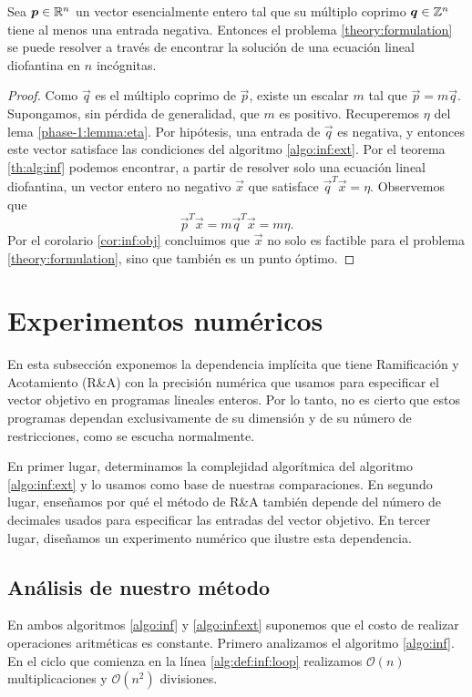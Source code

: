 \begin{theorem}
	\label{infinite:th:complexity}
	Sea $\boldsymbol{p} \in \mathbb{R}^n$ un vector esencialmente entero tal que su múltiplo coprimo $\boldsymbol{q} \in
	\mathbb{Z}^n$ tiene al menos una entrada negativa. Entonces el problema \eqref{theory:formulation} se
	puede resolver a través de encontrar la solución de una ecuación lineal diofantina en $n$
	incógnitas.
\end{theorem}
\begin{proof}
	Como $\vec{q}$ es el múltiplo coprimo de $\vec{p}$, existe un escalar $m$ tal que
	$\vec{p} = m\vec{q}$. Supongamos, sin pérdida de generalidad, que $m$ es positivo. Recuperemos
	$\eta$ del lema \ref{phase-1:lemma:eta}. Por hipótesis, una entrada de $\vec{q}$ es negativa, y
	entonces este vector satisface las condiciones del algoritmo \ref{algo:inf:ext}. Por el teorema
	\ref{th:alg:inf} podemos encontrar, a partir de resolver solo una ecuación lineal diofantina, un
	vector entero no negativo $\vec{x}$ que satisface $\vec{q}^T\vec{x} = \eta$. Observemos que
	\begin{equation*}
		\vec{p}^T\vec{x} = m\vec{q}^T\vec{x} = m\eta.
	\end{equation*}
	Por el corolario \ref{cor:inf:obj} concluimos que $\vec{x}$ no solo es factible para el problema
	\eqref{theory:formulation}, sino que también es un punto óptimo.
\end{proof}

\section{Experimentos numéricos}
\label{sec:inf:exp}
\noindent
En esta subsección exponemos la dependencia implícita que tiene Ramificación y Acotamiento (R\&A)
con la precisión numérica que usamos para especificar el vector objetivo en programas lineales
enteros. Por lo tanto, no es cierto que estos programas dependan exclusivamente de su dimensión y de
su número de restricciones, como se escucha normalmente.

En primer lugar, determinamos la complejidad algorítmica del algoritmo \ref{algo:inf:ext} y lo
usamos como base de nuestras comparaciones. En segundo lugar, enseñamos por qué el método de R\&A
también depende del número de decimales usados para especificar las entradas del vector objetivo. En
tercer lugar, diseñamos un experimento numérico que ilustre esta dependencia.

\subsection{Análisis de nuestro método}
\label{subsec:inf:complex}
\noindent
En ambos algoritmos \ref{algo:inf} y \ref{algo:inf:ext} suponemos que el costo de realizar
operaciones aritméticas es constante. Primero analizamos el algoritmo \ref{algo:inf}. En el ciclo
que comienza en la línea \ref{alg:def:inf:loop} realizamos $\mathcal{O}(n)$ multiplicaciones y
$\mathcal{O}(n^2)$ divisiones.

